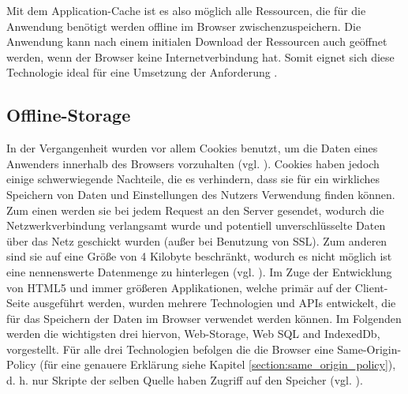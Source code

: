 Mit dem Application-Cache ist es also möglich alle Ressourcen, die für die Anwendung benötigt werden offline im Browser zwischenzuspeichern. Die Anwendung kann nach einem initialen Download der Ressourcen auch geöffnet werden, wenn der Browser keine Internetverbindung hat. Somit eignet sich diese Technologie ideal für eine Umsetzung der Anforderung .

\subsection{Offline-Storage}\label{section:offline_storage}
In der Vergangenheit wurden vor allem Cookies benutzt, um die Daten eines Anwenders innerhalb des Browsers vorzuhalten (vgl. \cite{Mahemoff22010}). Cookies haben jedoch einige schwerwiegende Nachteile, die es verhindern, dass sie für ein wirkliches Speichern von Daten und Einstellungen des Nutzers Verwendung finden können. Zum einen werden sie bei jedem Request an den Server gesendet, wodurch die Netzwerkverbindung verlangsamt wurde und potentiell unverschlüsselte Daten über das Netz geschickt wurden (außer bei Benutzung von SSL). Zum anderen sind sie auf eine Größe von 4 Kilobyte beschränkt, wodurch es nicht möglich ist eine nennenswerte Datenmenge zu hinterlegen (vgl. \cite{html5upandrunningchapter7}). Im Zuge der Entwicklung von HTML5 und immer größeren Applikationen, welche primär auf der Client-Seite ausgeführt werden, wurden mehrere Technologien und APIs entwickelt, die für das Speichern der Daten im Browser verwendet werden können. Im Folgenden werden die wichtigsten drei hiervon, Web-Storage, Web SQL and IndexedDb, vorgestellt. Für alle drei Technologien befolgen die die Browser eine Same-Origin-Policy (für eine genauere Erklärung siehe Kapitel \ref{section:same_origin_policy}), d. h. nur Skripte der selben Quelle haben Zugriff auf den Speicher (vgl. \cite{Mahemoff2010}).

